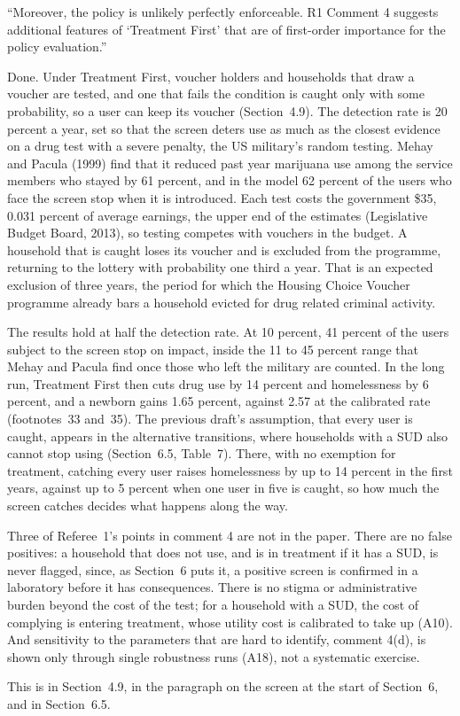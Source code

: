 \documentclass[11pt]{article}
\begin{document}
\begin{referee}
``Moreover, the policy is unlikely perfectly enforceable. R1 Comment 4 suggests
additional features of `Treatment First' that are of first-order importance for
the policy evaluation.''
\end{referee}
\begin{response}
Done. Under Treatment First, voucher holders and households that draw a voucher are
tested, and one that fails the condition is caught only with some probability, so a
user can keep its voucher (Section~4.9). The detection rate is 20 percent a year,
set so that the screen deters use as much as the closest evidence on a drug test
with a severe penalty, the US military's random testing. Mehay and Pacula (1999)
find that it reduced past year marijuana use among the service members who stayed
by 61 percent, and in the model 62 percent of the users who face the screen stop
when it is introduced. Each test costs the government \$35, 0.031 percent of
average earnings, the upper end of the estimates (Legislative Budget Board, 2013),
so testing competes with vouchers in the budget. A household that is caught loses
its voucher and is excluded from the programme, returning to the lottery with
probability one third a year. That is an expected exclusion of three years, the
period for which the Housing Choice Voucher programme already bars a household
evicted for drug related criminal activity.

The results hold at half the detection rate. At 10 percent, 41 percent of the users
subject to the screen stop on impact, inside the 11 to 45 percent range that Mehay
and Pacula find once those who left the military are counted. In the long run,
Treatment First then cuts drug use by 14 percent and homelessness by 6 percent, and
a newborn gains 1.65 percent, against 2.57 at the calibrated rate (footnotes~33
and~35). The previous draft's assumption, that every user is caught, appears in the
alternative transitions, where households with a SUD also cannot stop using
(Section~6.5, Table~7). There, with no exemption for treatment, catching every user
raises homelessness by up to 14 percent in the first years, against up to 5 percent
when one user in five is caught, so how much the screen catches decides what
happens along the way.

\open Three of Referee~1's points in comment 4 are not in the paper. There are no
false positives: a household that does not use, and is in treatment if it has a
SUD, is never flagged, since, as Section~6 puts it, a positive screen is confirmed
in a laboratory before it has consequences. There is no stigma or administrative
burden beyond the cost of the test; for a household with a SUD, the cost of
complying is entering treatment, whose utility cost is calibrated to take up (A10).
And sensitivity to the parameters that are hard to identify, comment 4(d), is shown
only through single robustness runs (A18), not a systematic exercise.

This is in Section~4.9, in the paragraph on the screen at the start of Section~6,
and in Section~6.5.
\end{response}
\end{document}
